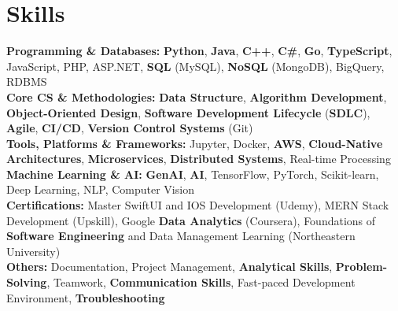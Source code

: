 \documentclass[a4paper,10pt]{article}
\begin{document}
\section*{Skills}
\textbf{Programming \& Databases: } \textbf{Python}, \textbf{Java}, \textbf{C++}, \textbf{C\#}, \textbf{Go}, \textbf{TypeScript}, JavaScript, PHP, ASP.NET, \textbf{SQL} (MySQL), \textbf{NoSQL} (MongoDB), BigQuery, RDBMS \\
\textbf{Core CS \& Methodologies:} \textbf{Data Structure}, \textbf{Algorithm Development}, \textbf{Object-Oriented Design}, \textbf{Software Development Lifecycle} (\textbf{SDLC}), \textbf{Agile}, \textbf{CI/CD}, \textbf{Version Control Systems} (Git) \\
\textbf{Tools, Platforms \& Frameworks:} Jupyter, Docker, \textbf{AWS}, \textbf{Cloud-Native Architectures}, \textbf{Microservices}, \textbf{Distributed Systems}, Real-time Processing \\
\textbf{Machine Learning \& AI: } \textbf{GenAI}, \textbf{AI}, TensorFlow, PyTorch, Scikit-learn, Deep Learning, NLP, Computer Vision \\
\textbf{Certifications:} Master SwiftUI and IOS Development (Udemy), MERN Stack Development (Upskill), Google \textbf{Data Analytics} (Coursera), Foundations of \textbf{Software Engineering} and Data Management Learning (Northeastern University) \\
\textbf{Others: } Documentation, Project Management, \textbf{Analytical Skills}, \textbf{Problem-Solving}, Teamwork, \textbf{Communication Skills}, Fast-paced Development Environment, \textbf{Troubleshooting} \\

\vspace{-4mm}
\end{document}
